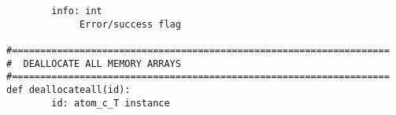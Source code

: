 \documentclass[10pt,a4paper]{article}
\begin{document}
\begin{verbatim}
        info: int
             Error/success flag

#===================================================================
#  DEALLOCATE ALL MEMORY ARRAYS
#===================================================================
def deallocateall(id):
        id: atom_c_T instance


\end{verbatim}



\end{document}

